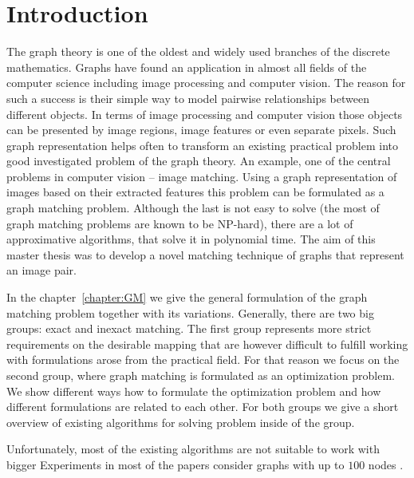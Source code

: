 \chapter{Introduction}
The graph theory is one of the oldest and widely used branches of the discrete mathematics. Graphs have found an application in almost all fields of the computer science including image processing and computer vision. The reason for such a success is their simple way to model pairwise relationships between different objects. In terms of image processing and computer vision those objects can be presented by image regions, image features or even separate pixels. Such graph representation helps often to transform an existing practical problem into good investigated problem of the graph theory. An example, one of the central problems in computer vision -- image matching. %
Using a graph representation of images based on their extracted features this problem can be formulated as a graph matching problem. Although the last is not easy to solve (the most of graph matching problems are known to be NP-hard), there are a lot of approximative algorithms, that solve it in polynomial time. The aim of this master thesis was to develop a novel matching technique of graphs that represent an image pair.

In the chapter~\ref{chapter:GM} we give the general formulation of the graph matching problem together with its variations. Generally, there are two big groups: exact and inexact matching. The first group represents more strict requirements on the desirable mapping that are however difficult to fulfill working with formulations arose from the practical field. For that reason we focus on the second group, where graph matching is formulated as an optimization problem.  We show different ways how to formulate the optimization problem and how different formulations are related to each other.
For both groups we give a short overview of existing algorithms for solving problem inside of the group.

Unfortunately, most of the existing algorithms are not suitable to work with bigger  Experiments in most of the papers consider graphs with up to $100$ nodes \cite{Cho2014_Haystack, Cho2010_RRWM, Cho2012_ProgressiveGM}.

